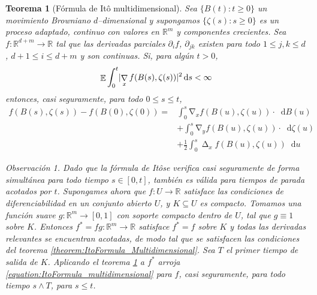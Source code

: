 \documentclass{article}
\newcommand{\ito}{Itô}
\newcommand{\brownian}{B}
\newcommand{\dd}{\mathop{}\!\mathrm{d}}
\newcommand{\realNumbers}{\mathbb{R}}
\DeclareMathOperator{\laplacian}{\Delta}
\DeclareMathOperator{\grad}{\nabla}
\DeclareMathOperator{\Expectation}{\mathbb{E}}
\DeclarePairedDelimiter{\abs}{\lvert}{\rvert}
\theoremstyle{plain}
\newtheorem{theorem}{Teorema}
\theoremstyle{remark}
\newtheorem{remark}{Observación}
\theoremstyle{definition}
\begin{document}
\begin{theorem}[Fórmula de \ito{} multidimensional]
  \label{theorem:ItoFormula_multidimensional}
  Sea \(\{\brownian(t) : t \geq 0\}\) un movimiento Browniano \(d\)--dimensional y supongamos \(\{\zeta(s) : s \geq 0\}\) es un proceso adaptado, continuo con valores en \(\realNumbers^m\) y componentes crecientes.
  Sea \(f : \realNumbers^{d + m} \rightarrow \realNumbers\) tal que las derivadas parciales \(\partial_i f\), \(\partial_{j k}\) existen para todo \(1 \leq j, k \leq d\), \(d + 1 \leq i \leq d + m\) y son continuas.
  Si, para algún \(t > 0\),
  \begin{align}
    \Expectation \int_0^t \abs{\grad_x f(\brownian(s), \zeta(s))}^2 \dd s
    <
    \infty
  \end{align}
  entonces, casi seguramente, para todo \(0 \leq s \leq t\),
  \begin{align}
    f(\brownian(s), \zeta(s)) - f(\brownian(0), \zeta(0))
    =
    &\int_0^s \grad_x f(\brownian(u), \zeta(u)) \cdot \dd \brownian(u)
    \nonumber
    \\
    &+ \int_0^s \grad_y f(\brownian(u), \zeta(u)) \cdot \dd \zeta(u)
    \nonumber
    \\
    &+ \frac{1}{2} \int_0^s \laplacian_x f(\brownian(u), \zeta(u)) \dd u
    \label{equation:ItoFormula_multidimensional}
  \end{align}
  \begin{remark}
    Dado que la fórmula de \ito se verifica casi seguramente de forma simultánea para todo tiempo \(s \in [0, t]\), también es válida para tiempos de parada acotados por \(t\).
    Supongames ahora que \(f : U \rightarrow \realNumbers\) satisface las condiciones de diferenciabilidad en un conjunto abierto \(U\), y \(K \subseteq U\) es compacto.
    Tomamos una función suave \(g : \realNumbers^m \rightarrow [0, 1]\) con soporte compacto dentro de \(U\), tal que \(g \equiv 1\) sobre \(K\).
    Entonces \(f^* = f g : \realNumbers^m \rightarrow \realNumbers\) satisface \(f^* = f\) sobre \(K\) y todas las derivadas relevantes se encuentran acotadas, de modo tal que se satisfacen las condiciones del teorema \ref{theorem:ItoFormula_Multidimensional}.
    Sea \(T\) el primer tiempo de salida de \(K\).
    Aplicando el teorema \ref{theorem:ItoFormula_multidimensional} a \(f^*\) arroja \eqref{equation:ItoFormula_multidimensional} para \(f\), casi seguramente, para todo tiempo \(s \wedge T\), para \(s \leq t\).
  \end{remark}
\end{theorem}

\end{document}
